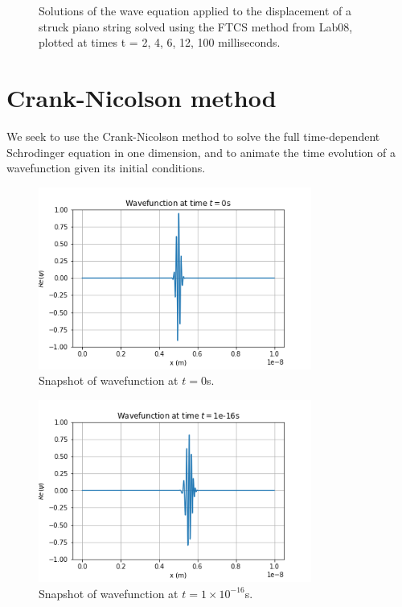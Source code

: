 \documentclass{article}
\begin{document}
\begin{figure}[H]
\begin{minipage}[b]{0.33\linewidth}
  	\end{minipage}	
 	\caption{Solutions of the wave equation applied to the displacement of a struck piano string solved using the FTCS method from Lab08, plotted at times t = 2, 4, 6, 12, 100 milliseconds.} 
\label{fig:wave_FTCS} 
\end{figure}


\section{Crank-Nicolson method}

We seek to use the Crank-Nicolson method to solve the full time-dependent Schrodinger equation in one dimension, and to animate the time evolution of a wavefunction given its initial conditions.

\begin{figure}[H]
	\centering
	\includegraphics[width=0.8\textwidth]{../images/q2_t=0.png}
	\caption{Snapshot of wavefunction at $t=0$s.}
	\label{fig:q2_t=0}
\end{figure}

\begin{figure}[H]
	\centering
	\includegraphics[width=0.8\textwidth]{../images/q2_t=1e-16.png}
	\caption{Snapshot of wavefunction at $t=1\times 10^{-16}$s.}
	\label{fig:q2_t=1e-16}
\end{figure}
\end{document}
